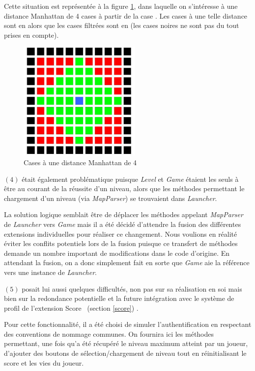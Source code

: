 \documentclass[12pt, openany]{report}
\begin{document}
Cette situation est représentée à la figure \ref{manhattan}, dans laquelle on s'intéresse à une distance Manhattan de 4 cases à partir de la case {\color{blue}{bleue}}. Les cases à une telle distance sont en {\color{green}{vert}} alors que les cases filtrées sont en {\color{red}{rouge}} (les cases noires ne sont pas du tout prises en compte).
\begin{figure}[h]
	\centering
	\includegraphics[width=6cm]{Images/manhattan.jpg}
	\caption{\label{manhattan} Cases à une distance Manhattan de 4}
\end{figure}

$(4)$ était également problématique puisque \mbox{\textit{Level}} et \mbox{\textit{Game}} étaient les seuls à être au courant de la réussite d'un niveau, alors que les méthodes permettant le chargement d'un niveau (via \mbox{\textit{MapParser}}) se trouvaient dans \mbox{\textit{Launcher}}. 

La solution logique semblait être de déplacer les méthodes appelant \mbox{\textit{MapParser}} de \mbox{\textit{Launcher}} vers \mbox{\textit{Game}} mais il a été décidé d'attendre la fusion des différentes extensions individuelles pour réaliser ce changement. Nous voulions en réalité éviter les conflits potentiels lors de la fusion puisque ce \og transfert \fg de méthodes demande un nombre important de modifications dans le code d'origine. En attendant la fusion, on a donc simplement fait en sorte que \mbox{\textit{Game}} aie la référence vers une instance de \mbox{\textit{Launcher}}.

$(5)$ posait lui aussi quelques difficultés, non pas sur sa réalisation en soi mais bien sur la redondance potentielle et la future intégration avec le système de profil de l'extension \og Score \fg \, (section \ref{score}) . 

Pour cette fonctionnalité, il a été choisi de simuler l'authentification en respectant des conventions de nommage communes. On fournira ici les méthodes permettant, une fois qu'a été récupéré le niveau maximum atteint par un joueur, d'ajouter des boutons de sélection/chargement de niveau tout en réinitialisant le score et les vies du joueur.
\end{document}
